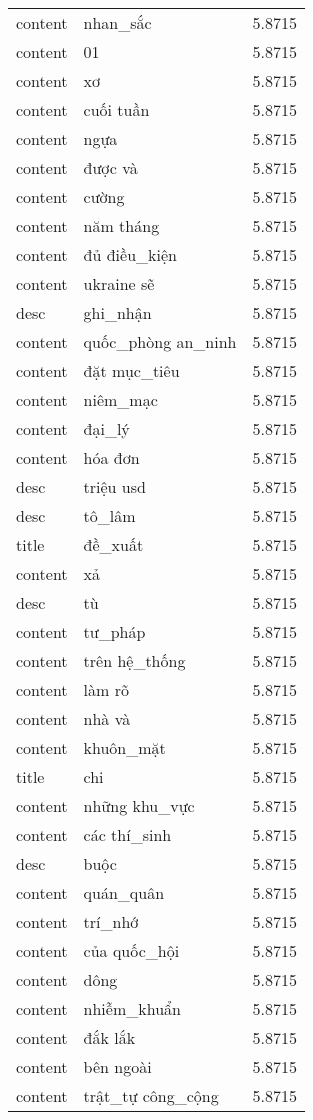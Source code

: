 \documentclass{article}
\begin{document}
\begin{tabular}{lll}
content & nhan\_sắc & 5.8715\\
content & 01 & 5.8715\\
content & xơ & 5.8715\\
content & cuối tuần & 5.8715\\
content & ngựa & 5.8715\\
content & được và & 5.8715\\
content & cường & 5.8715\\
content & năm tháng & 5.8715\\
content & đủ điều\_kiện & 5.8715\\
content & ukraine sẽ & 5.8715\\
desc & ghi\_nhận & 5.8715\\
content & quốc\_phòng an\_ninh & 5.8715\\
content & đặt mục\_tiêu & 5.8715\\
content & niêm\_mạc & 5.8715\\
content & đại\_lý & 5.8715\\
content & hóa đơn & 5.8715\\
desc & triệu usd & 5.8715\\
desc & tô\_lâm & 5.8715\\
title & đề\_xuất & 5.8715\\
content & xả & 5.8715\\
desc & tù & 5.8715\\
content & tư\_pháp & 5.8715\\
content & trên hệ\_thống & 5.8715\\
content & làm rõ & 5.8715\\
content & nhà và & 5.8715\\
content & khuôn\_mặt & 5.8715\\
title & chi & 5.8715\\
content & những khu\_vực & 5.8715\\
content & các thí\_sinh & 5.8715\\
desc & buộc & 5.8715\\
content & quán\_quân & 5.8715\\
content & trí\_nhớ & 5.8715\\
content & của quốc\_hội & 5.8715\\
content & dông & 5.8715\\
content & nhiễm\_khuẩn & 5.8715\\
content & đắk lắk & 5.8715\\
content & bên ngoài & 5.8715\\
content & trật\_tự công\_cộng & 5.8715\\

\end{tabular}
\end{document}
